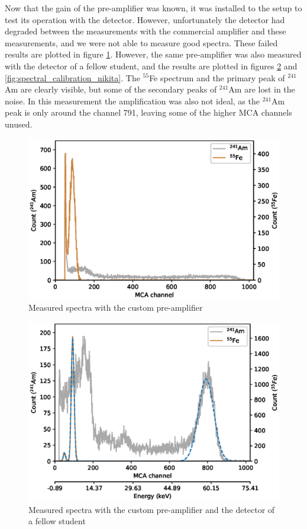 \documentclass[a4paper]{article}
\begin{document}
\begin{appendices}
\FloatBarrier
Now that the gain of the pre-amplifier was known, it was installed to the setup to test its operation with the detector.
However, unfortunately the detector had degraded between the measurements with the commercial amplifier and these measurements, and we were not able to measure good spectra.
These failed results are plotted in figure \ref{fig:pre_amp_testing}.
However, the same pre-amplifier was also measured with the detector of a fellow student, and the results are plotted in figures \ref{fig:pre_amp_testing_nikita} and \ref{fig:spectral_calibration_nikita}.
The $^{55}$Fe spectrum and the primary peak of $^{241}$Am are clearly visible, but some of the secondary peaks of $^{241}$Am are lost in the noise.
In this measurement the amplification was also not ideal, as the $^{241}$Am peak is only around the channel 791, leaving some of the higher MCA channels unused.

\begin{figure}[ht!]
\centering
\includegraphics[width=\textwidth]{fig/python/spectra_custom_preamp}
\caption{Measured spectra with the custom pre-amplifier}
\label{fig:pre_amp_testing}
\end{figure}

\begin{figure}[ht!]
\centering
\includegraphics[width=\textwidth]{fig/python/spectra_custom_preamp_Nikitas_detector}
\caption{Measured spectra with the custom pre-amplifier and the detector of a fellow student}
\label{fig:pre_amp_testing_nikita}
\end{figure}


\end{appendices}
\end{document}
